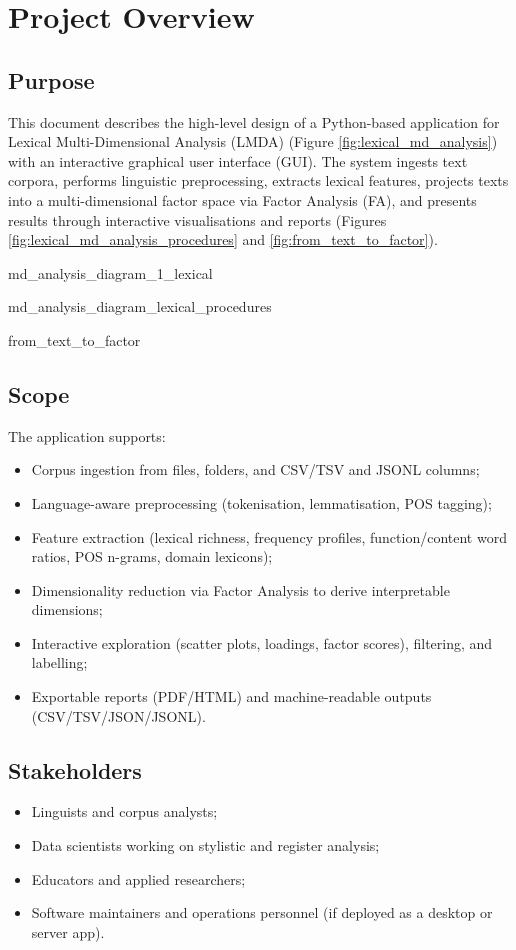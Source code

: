 \section{Project Overview}
\subsection{Purpose}
This document describes the high-level design of a Python-based application for Lexical Multi-Dimensional Analysis (LMDA) (Figure \ref{fig:lexical_md_analysis}) with an interactive graphical user interface (GUI). The system ingests text corpora, performs linguistic preprocessing, extracts lexical features, projects texts into a multi-dimensional factor space via Factor Analysis (FA), and presents results through interactive visualisations and reports (Figures \ref{fig:lexical_md_analysis_procedures} and \ref{fig:from_text_to_factor}).

{md_analysis_diagram_1_lexical}

{md_analysis_diagram_lexical_procedures}

{from_text_to_factor}

\subsection{Scope}
The application supports:
\begin{itemize}
    \item Corpus ingestion from files, folders, and CSV/TSV and JSONL columns;
    \item Language-aware preprocessing (tokenisation, lemmatisation, POS tagging);
    \item Feature extraction (lexical richness, frequency profiles, function/content word ratios, POS n-grams, domain lexicons);
    \item Dimensionality reduction via Factor Analysis to derive interpretable dimensions;
    \item Interactive exploration (scatter plots, loadings, factor scores), filtering, and labelling;
    \item Exportable reports (PDF/HTML) and machine-readable outputs (CSV/TSV/JSON/JSONL).
\end{itemize}

\subsection{Stakeholders}
\begin{itemize}
    \item Linguists and corpus analysts;
    \item Data scientists working on stylistic and register analysis;
    \item Educators and applied researchers;
    \item Software maintainers and operations personnel (if deployed as a desktop or server app).
\end{itemize}

